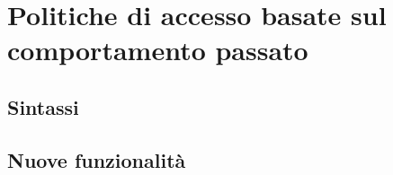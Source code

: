 \chapter{Politiche di accesso basate sul comportamento passato}
\label{chap:Politiche di accesso basate sul comportamento passato}

\section{Sintassi}
\label{sec:Sintassi}

\section{Nuove funzionalit\`a}
\label{sec:Nuove funzionalita}
